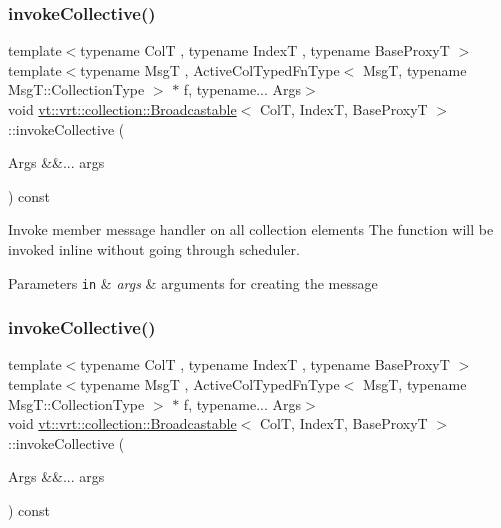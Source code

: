 \subsubsection{\texorpdfstring{invoke\+Collective()}{invokeCollective()}\hspace{0.1cm}{\footnotesize\ttfamily [1/3]}}
{\footnotesize\ttfamily template$<$typename ColT , typename IndexT , typename Base\+ProxyT $>$ \\
template$<$typename MsgT , Active\+Col\+Typed\+Fn\+Type$<$ Msg\+T, typename Msg\+T\+::\+Collection\+Type $>$ $\ast$ f, typename... Args$>$ \\
void \hyperlink{structvt_1_1vrt_1_1collection_1_1_broadcastable}{vt\+::vrt\+::collection\+::\+Broadcastable}$<$ ColT, IndexT, Base\+ProxyT $>$\+::invoke\+Collective (\begin{DoxyParamCaption}\item[{Args \&\&...}]{args }\end{DoxyParamCaption}) const}



Invoke member message handler on all collection elements The function will be invoked inline without going through scheduler. 


\begin{DoxyParams}[1]{Parameters}
\mbox{\tt in}  & {\em args} & arguments for creating the message \\
\hline
\end{DoxyParams}
\mbox{\label{structvt_1_1vrt_1_1collection_1_1_broadcastable_a3acc97a928f8d184e54d696e49377008}} 
\subsubsection{\texorpdfstring{invoke\+Collective()}{invokeCollective()}\hspace{0.1cm}{\footnotesize\ttfamily [2/3]}}
{\footnotesize\ttfamily template$<$typename ColT , typename IndexT , typename Base\+ProxyT $>$ \\
template$<$typename MsgT , Active\+Col\+Typed\+Fn\+Type$<$ Msg\+T, typename Msg\+T\+::\+Collection\+Type $>$ $\ast$ f, typename... Args$>$ \\
void \hyperlink{structvt_1_1vrt_1_1collection_1_1_broadcastable}{vt\+::vrt\+::collection\+::\+Broadcastable}$<$ ColT, IndexT, Base\+ProxyT $>$\+::invoke\+Collective (\begin{DoxyParamCaption}\item[{Args \&\&...}]{args }\end{DoxyParamCaption}) const}



